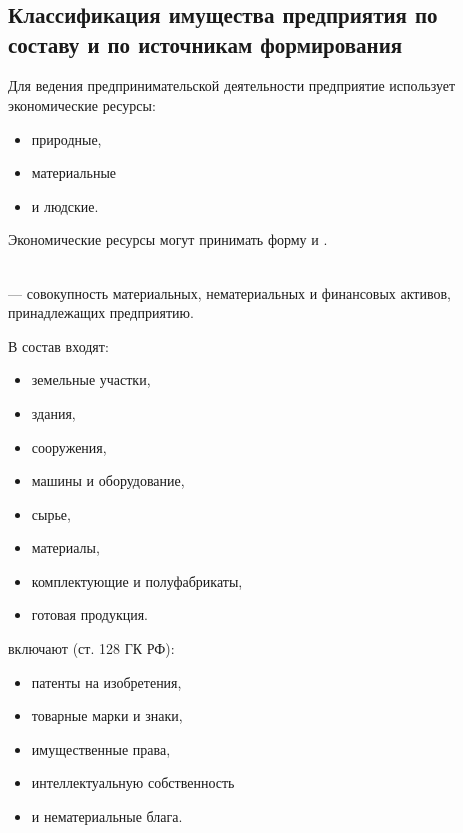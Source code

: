 \chapter{}

\section{Классификация имущества предприятия по составу и по источникам
формирования}

Для ведения предпринимательской деятельности предприятие использует
экономические ресурсы:
\begin{itemize}
    \item природные,
    \item материальные
    \item и людские.
\end{itemize}

Экономические ресурсы могут принимать форму  и
.

\begin{definition}
    \normalfont
    ~\\
     --- совокупность материальных, нематериальных
    и финансовых активов, принадлежащих предприятию.
\end{definition}

В состав  входят:
\begin{itemize}
    \item земельные участки,
    \item здания,
    \item сооружения,
    \item машины и оборудование,
    \item сырье,
    \item материалы,
    \item комплектующие и полуфабрикаты,
    \item готовая продукция.
\end{itemize}

 включают (ст. 128 ГК РФ):

\begin{itemize}
    \item патенты на изобретения,
    \item товарные марки и знаки,
    \item имущественные права,
    \item интеллектуальную собственность
    \item и нематериальные блага.
\end{itemize}

